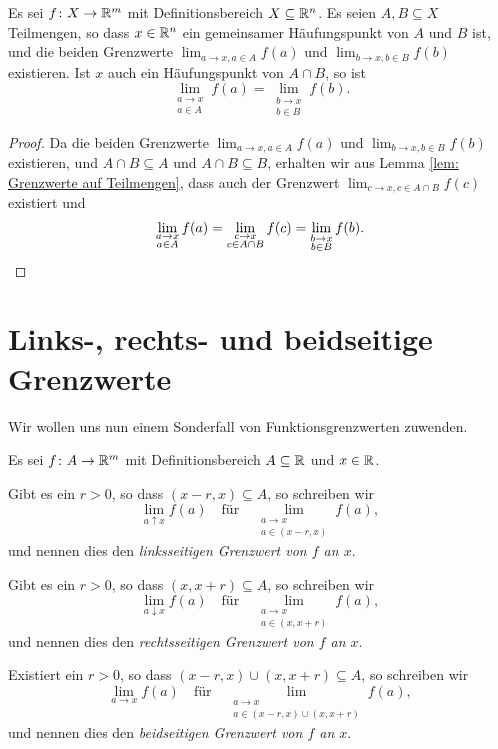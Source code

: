 \documentclass[a4paper,10pt]{article}
\begin{document}
\begin{kor}\label{kor: gemeinsamer Häufungspunkt mit gemeinsamen Grenzwert}
 Es sei $f \colon X \to \mathbb{R}^m$ mit Definitionsbereich $X \subseteq \mathbb{R}^n$. Es seien $A, B \subseteq X$ Teilmengen, so dass $x \in \mathbb{R}^n$ ein gemeinsamer Häufungspunkt von $A$ und $B$ ist, und die beiden Grenzwerte $\lim_{a \to x, a \in A} f(a)$ und $\lim_{b \to x, b \in B} f(b)$ existieren. Ist $x$ auch ein Häufungspunkt von $A \cap B$, so ist
 \[
  \lim_{\substack{a \to x \\ a \in A}} f(a)
  = \lim_{\substack{b \to x \\ b \in B}} f(b).
 \]
\end{kor}
\begin{proof}
 Da die beiden Grenzwerte $\lim_{a \to x, a \in A} f(a)$ und $\lim_{b \to x, b \in B} f(b)$ existieren, und $A \cap B \subseteq A$ und $A \cap B \subseteq B$, erhalten wir aus Lemma \ref{lem: Grenzwerte auf Teilmengen}, dass auch der Grenzwert $\lim_{c \to x, c \in A \cap B} f(c)$ existiert und
 \[
  \lim_{\substack{a \to x \\ a \in A}} f(a)
  = \lim_{\substack{c \to x \\ c \in A \cap B}} f(c)
  = \lim_{\substack{b \to x \\ b \in B}} f(b).
  \qedhere
 \]
\end{proof}





\section{Links-, rechts- und beidseitige Grenzwerte}
Wir wollen uns nun einem Sonderfall von Funktionsgrenzwerten zuwenden.


\begin{defi}
 Es sei $f \colon A \to \mathbb{R}^m$ mit Definitionsbereich $A \subseteq \mathbb{R}$ und $x \in \mathbb{R}$.
 
 Gibt es ein $r > 0$, so dass $(x-r, x) \subseteq A$, so schreiben wir
 \[
  \lim_{a \uparrow x} f(a)
  \quad
  \text{für}
  \quad
  \lim_{\substack{a \to x \\ a \in (x-r,x)}} f(a),
 \]
 und nennen dies den \emph{linksseitigen Grenzwert von $f$ an $x$}.
 
 Gibt es ein $r > 0$, so dass $(x,x+r) \subseteq A$, so schreiben wir
 \[
  \lim_{a \downarrow x} f(a)
  \quad
  \text{für}
  \quad
  \lim_{\substack{a \to x \\ a \in (x,x+r)}} f(a),
 \]
 und nennen dies den \emph{rechtsseitigen Grenzwert von $f$ an $x$}.
 
 Existiert ein $r > 0$, so dass $(x-r,x) \cup (x,x+r) \subseteq A$, so schreiben wir
 \[
  \lim_{a \to x} f(a)
  \quad
  \text{für}
  \quad
  \lim_{\substack{a \to x \\ a \in (x-r,x) \cup (x,x+r)}} f(a),
 \]
 und nennen dies den \emph{beidseitigen Grenzwert von $f$ an $x$}.
\end{defi}
\end{document}
